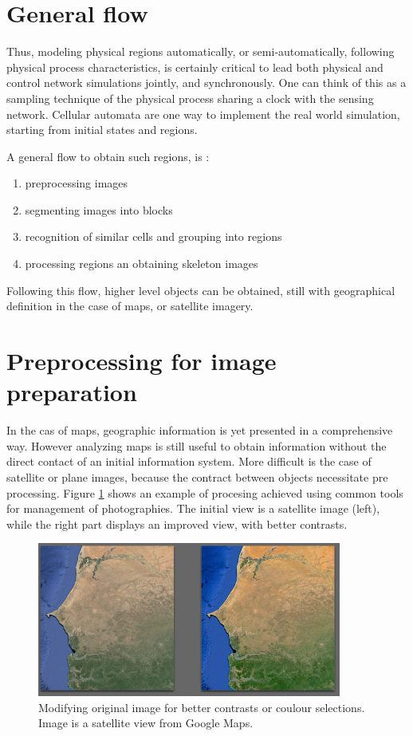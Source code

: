 \section{General flow}

Thus,   modeling  physical regions automatically, or semi-automatically, following physical process 
characteristics, is certainly critical to lead both physical and control network  simulations jointly,
and synchronously. One can think of this as a sampling technique of the physical process sharing
a clock with the sensing network. Cellular automata are one way to implement the real world simulation,
starting from initial states and regions.


A general flow to obtain such regions, is :
\begin{enumerate}
\item  preprocessing  images 
\item segmenting images into blocks
\item recognition of similar cells and grouping into regions
\item processing regions an obtaining skeleton images
\end{enumerate}

Following this flow, higher level objects can be obtained, still with geographical definition in the case of
maps, or satellite imagery.

\section {Preprocessing for image preparation }

In the cas of maps, geographic information is yet presented in a comprehensive way. However analyzing maps is still useful
to obtain information without the direct contact of an initial information system.
More difficult is the case of satellite or plane images, because the contract between objects necessitate
pre processing. Figure \ref{fig:sideBySide} shows an example of procesing achieved using common tools
for management of photographies. The initial view is a satellite image (left), while the right part displays an improved
view, with better contrasts.

\begin{figure}[hbtp]
\begin{center} 
\includegraphics[width=10cm]{SenegalSideBySide.png}
\caption{Modifying original image for better contrasts or coulour selections. Image is a satellite view from Google Maps.}
\label{fig:sideBySide}
\end{center}
\end{figure}


